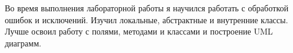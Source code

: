 Во время выполнения лабораторной работы я научился работать с обработкой ошибок и исключений. Изучил локальные, абстрактные и внутренние классы. Лучше освоил работу с полями, методами и классами и построение UML диаграмм.